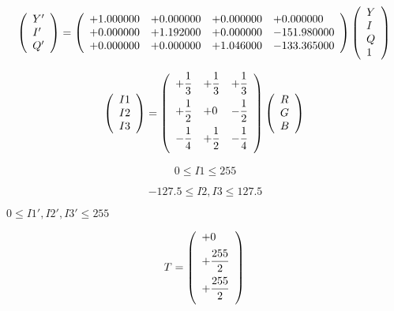 \documentclass{article}
\begin{document}
\[ \left( \begin{array}{l} Y' \\ I' \\ Q' \\ \end{array} \right) = \left( \begin{array}{llll} +1.000000 & +0.000000 & +0.000000 & +0.000000 \\ +0.000000 & +1.192000 & +0.000000 & -151.980000 \\ +0.000000 & +0.000000 & +1.046000 & -133.365000 \\ \end{array} \right) \left( \begin{array}{l} Y \\ I \\ Q \\ 1 \\ \end{array} \right) \\ \]
\pagebreak

\[ \left( \begin{array}{l} I1 \\ I2 \\ I3 \\ \end{array} \right) = \left( \begin{array}{lll} +\dfrac{1}{3} & +\dfrac{1}{3} & +\dfrac{1}{3} \vspace{.5em} \\ +\dfrac{1}{2} & +0 & -\dfrac{1}{2} \vspace{.5em} \\ -\dfrac{1}{4} & +\dfrac{1}{2} & -\dfrac{1}{4} \vspace{.5em} \\ \end{array} \right) \left( \begin{array}{l} R \\ G \\ B \\ \end{array} \right)\\ \]
\pagebreak

\[ 0 \le I1 \le 255 \]
\pagebreak

\[ -127.5 \le I2, I3 \le 127.5 \]
\pagebreak

$ 0 \le I1', I2', I3' \le 255 $
\pagebreak

\[ T = \left( \begin{array}{l} +0 \vspace{.5em} \\ +\dfrac{255}{2} \vspace{.5em} \\ +\dfrac{255}{2} \vspace{.5em} \\ \end{array} \right) \\ \]
\pagebreak
\end{document}
